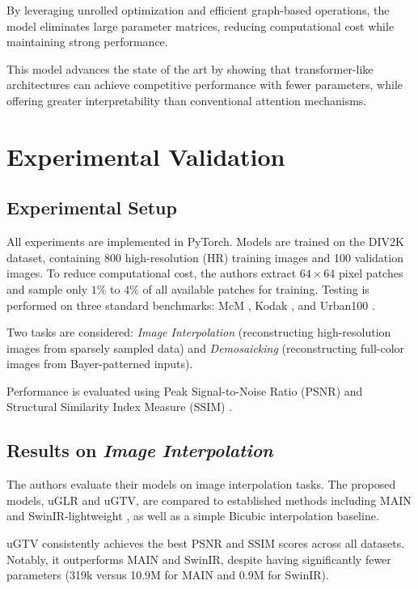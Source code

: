 \documentclass{article}
\theoremstyle{plain}
\theoremstyle{definition}
\theoremstyle{remark}
\begin{document}
By leveraging unrolled optimization and efficient graph-based operations, the model eliminates large parameter matrices, reducing computational cost while maintaining strong performance.

This model advances the state of the art by showing that transformer-like architectures can achieve competitive performance with fewer parameters, while offering greater interpretability than conventional attention mechanisms.

\section{Experimental Validation}

\subsection{Experimental Setup}

All experiments are implemented in PyTorch. Models are trained on the DIV2K dataset, containing 800 high-resolution (HR) training images and 100 validation images. To reduce computational cost, the authors extract $64 \times 64$ pixel patches and sample only $1\%$ to $4\%$ of all available patches for training. Testing is performed on three standard benchmarks: McM \cite{zhang2011color}, Kodak \cite{kodak1993}, and Urban100 \cite{huang2015single}.

Two tasks are considered: \textit{Image Interpolation} (reconstructing high-resolution images from sparsely sampled data) and \textit{Demosaicking} (reconstructing full-color images from Bayer-patterned inputs).

Performance is evaluated using Peak Signal-to-Noise Ratio (PSNR) and Structural Similarity Index Measure (SSIM) \cite{wang2004image}.

\subsection{Results on \textit{Image Interpolation}}

The authors evaluate their models on image interpolation tasks. The proposed models, uGLR and uGTV, are compared to established methods including MAIN \cite{ji2020image} and SwinIR-lightweight \cite{liang2021swinir}, as well as a simple Bicubic interpolation baseline.

uGTV consistently achieves the best PSNR and SSIM scores across all datasets. Notably, it outperforms MAIN and SwinIR, despite having significantly fewer parameters (319k versus 10.9M for MAIN and 0.9M for SwinIR).
\end{document}
